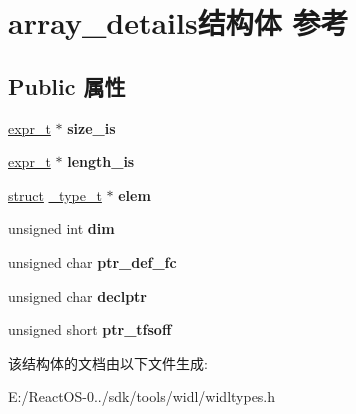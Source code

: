\hypertarget{structarray__details}{}\section{array\+\_\+details结构体 参考}
\label{structarray__details}
\subsection*{Public 属性}
\begin{DoxyCompactItemize}
\item 
\mbox{\label{structarray__details_ac31657de778d3fc4d0f26beeae20130e}} 
\hyperlink{struct__expr__t}{expr\+\_\+t} $\ast$ {\bfseries size\+\_\+is}
\item 
\mbox{\label{structarray__details_aca22edf2f47666517a95c896514e2ed5}} 
\hyperlink{struct__expr__t}{expr\+\_\+t} $\ast$ {\bfseries length\+\_\+is}
\item 
\mbox{\label{structarray__details_a0b1fb92cb5b6f1b9ae0b16d82f21e4a3}} 
\hyperlink{interfacestruct}{struct} \hyperlink{struct__type__t}{\+\_\+type\+\_\+t} $\ast$ {\bfseries elem}
\item 
\mbox{\label{structarray__details_a1b5607583cf70a8d2ac084930c70193d}} 
unsigned int {\bfseries dim}
\item 
\mbox{\label{structarray__details_afd1056974c3b09f0f0d745f23499968d}} 
unsigned char {\bfseries ptr\+\_\+def\+\_\+fc}
\item 
\mbox{\label{structarray__details_a2907607ea4a08398941fb345b11429f3}} 
unsigned char {\bfseries declptr}
\item 
\mbox{\label{structarray__details_afd05cd2376a1a430856ef2c692be2ec1}} 
unsigned short {\bfseries ptr\+\_\+tfsoff}
\end{DoxyCompactItemize}


该结构体的文档由以下文件生成\+:\begin{DoxyCompactItemize}
\item 
E\+:/\+React\+O\+S-\/0../sdk/tools/widl/widltypes.\+h\end{DoxyCompactItemize}
